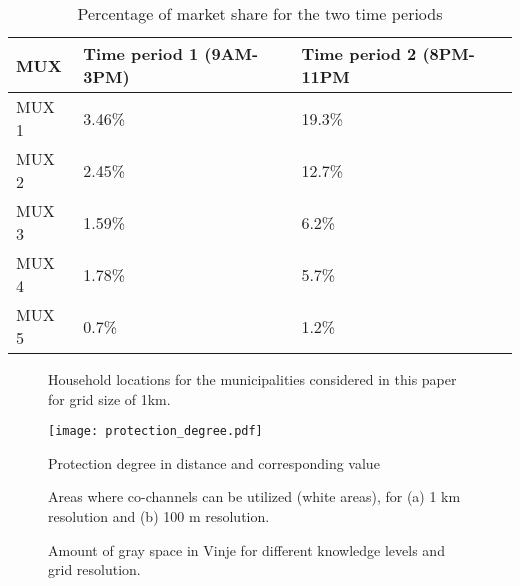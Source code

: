 \documentclass[journal,11pt,draftclsnofoot,onecolumn]{IEEEtran}
\begin{document}
\begin{table}[t]
\centering
\caption{Percentage of market share for the two time periods}
\begin{tabular}{|l|l|l|}
\hline
\textbf{MUX} & \textbf{Time period 1 (9AM-3PM)} & \textbf{Time period 2 (8PM-11PM} \\
\hline
MUX 1 & 3.46\% & 19.3\%\\
MUX 2 & 2.45\% & 12.7\% \\
MUX 3 & 1.59\% & 6.2\%\\
MUX 4 & 1.78\% & 5.7\% \\
MUX 5 & 0.7\% & 1.2\% \\
\hline
\end{tabular}
\label{tab:kl3-percent}
\end{table}

\begin{figure*}[t]
\centering
{}
\caption{Household locations for the municipalities considered in this paper for grid size of 1km.}
\label{fig:densities}
\end{figure*}

\begin{figure}[t!]
\centering
\texttt{[image: protection\_degree.pdf]}
\caption{Protection degree in distance and corresponding  value}
\label{fig:protection-degree}
\end{figure}

\begin{figure}[t!]
\centering
{}
\caption{Areas where co-channels can be utilized (white areas), for (a) 1 km resolution and (b) 100 m resolution.}
\label{fig:vinje-diff-100-1000}
\end{figure}

\begin{figure}[t!]
\centering
{}
\caption{Amount of gray space in Vinje for different knowledge levels and grid resolution.}
\label{fig:res-gray-space-vinje}
\end{figure}
\end{document}
